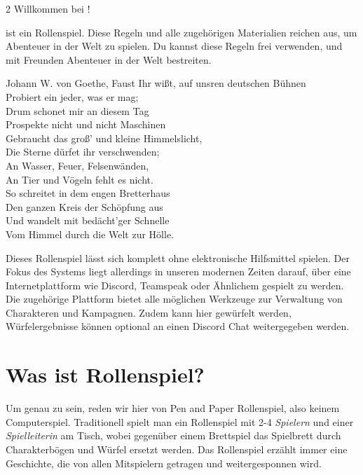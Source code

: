 \label{ch:introduction}

\begin{multicols}{2}
Willkommen bei \textit{}!

\textit{} ist ein Rollenspiel. Diese Regeln und alle zugehörigen Materialien reichen aus, um Abenteuer in der Welt  zu spielen. Du kannst diese Regeln frei verwenden, und mit Freunden Abenteuer in der Welt bestreiten.


\begin{pquote}{Johann W. von Goethe, Faust}
Ihr wißt, auf unsren deutschen Bühnen\\
Probiert ein jeder, was er mag;\\
Drum schonet mir an diesem Tag\\
Prospekte nicht und nicht Maschinen\\
Gebraucht das groß' und kleine Himmelslicht,\\
Die Sterne dürfet ihr verschwenden;\\
An Wasser, Feuer, Felsenwänden,\\
An Tier und Vögeln fehlt es nicht.\\
So schreitet in dem engen Bretterhaus\\
Den ganzen Kreis der Schöpfung aus\\
Und wandelt mit bedächt'ger Schnelle\\
Vom Himmel durch die Welt zur Hölle.
\end{pquote}

Dieses Rollenspiel lässt sich komplett ohne elektronische Hilfsmittel spielen. Der Fokus des Systems liegt allerdings in unseren modernen Zeiten darauf, über eine Internetplattform wie Discord, Teamspeak oder Ähnlichem gespielt zu werden. Die zugehörige Plattform \href{\trans{book_website}}{} bietet alle möglichen Werkzeuge zur Verwaltung von Charakteren und Kampagnen. Zudem kann hier gewürfelt werden, Würfelergebnisse können optional an einen Discord Chat weitergegeben werden.

\section{Was ist Rollenspiel?}

Um genau zu sein, reden wir hier von Pen and Paper Rollenspiel, also keinem Computerspiel. Traditionell spielt man ein Rollenspiel mit 2-4 \textit{Spielern} und einer \textit{Spielleiterin} am Tisch, wobei gegenüber einem Brettspiel das Spielbrett durch Charakterbögen und Würfel ersetzt werden. Das Rollenspiel erzählt immer eine Geschichte, die von allen Mitspielern getragen und weitergesponnen wird.


\end{multicols}
